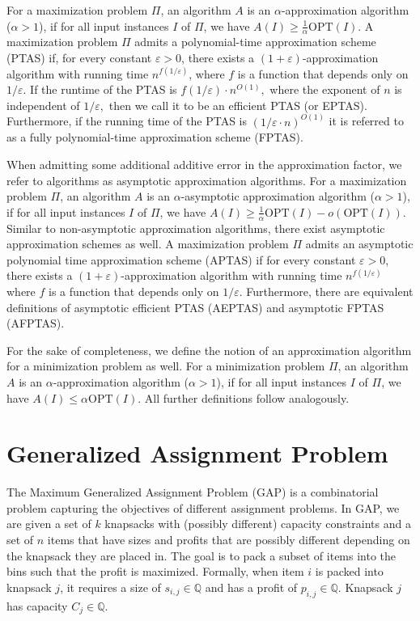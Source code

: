 \documentclass[10pt,a4paper]{amsart}
\newcommand{\eps}{\varepsilon}
\theoremstyle{definition}
\begin{document}
For a maximization problem $\Pi$, an algorithm $A$ is an $\alpha$-approximation algorithm ($\alpha>1$), if for all input instances $I$ of $\Pi$, we have  $A(I)\ge \frac{1}{\alpha} \text{OPT}(I)$. 
A maximization problem $\Pi$ admits a polynomial-time approximation scheme (PTAS) if, for every constant $\eps>0$, there exists a $(1+\eps)$-approximation algorithm with running time $n^{f(1/\eps)}$, where $f$ is a function that depends only on $1/\eps$.
If the runtime of the PTAS is ${f(1/\eps)} \cdot n^{O(1)},$ where the exponent of $n$ is independent of $1/\eps,$ then we call it to be an efficient PTAS (or EPTAS). 
Furthermore, if the running time of the PTAS is $(1/\eps\cdot n)^{O(1)}$ it is referred to as a fully polynomial-time approximation scheme (FPTAS). 

When admitting some additional additive error in the approximation factor, we refer to algorithms as asymptotic approximation algorithms. For a maximization problem $\Pi$, an algorithm $A$ is an $\alpha$-asymptotic approximation algorithm ($\alpha>1$), if for all input instances $I$ of $\Pi$, we have  $A(I)\ge \frac{1}{\alpha} \text{OPT}(I)- o(\text{OPT}(I))$. 
Similar to non-asymptotic approximation algorithms, there exist asymptotic approximation schemes as well. A maximization problem $\Pi$ admits an asymptotic polynomial time approximation scheme (APTAS) if for every constant $\eps>0$, there exists a $(1+\eps)$-approximation algorithm with running time $n^{f(1/\eps)}$ where $f$ is a function that depends only on $1/\eps$. Furthermore, there are equivalent definitions of asymptotic efficient PTAS (AEPTAS) and asymptotic FPTAS (AFPTAS).

For the sake of completeness, we define the notion of an approximation algorithm for a minimization problem as well. 
For a minimization problem $\Pi$, an algorithm $A$ is an $\alpha$-approximation algorithm ($\alpha>1$), if for all input instances $I$ of $\Pi$, we have  $A(I) \le \alpha \text{OPT}(I)$. All further definitions follow analogously.



\section{Generalized Assignment Problem}
\label{subsec:GAP}
The Maximum Generalized Assignment Problem (GAP) is a combinatorial problem capturing the objectives of different assignment problems. In GAP, we are given a set of $k$ knapsacks with (possibly different) capacity constraints and a set of $n$ items that have sizes and profits that are possibly different depending on the knapsack they are placed in. The goal is to pack a subset of items into the bins such that the profit is maximized. Formally, when item $i$ is packed into knapsack $j$, it requires a size of $s_{i,j}\in \mathbb{Q}$ and has a profit of $p_{i,j}\in \mathbb{Q}.$ Knapsack $j$ has capacity $C_j \in \mathbb{Q}$.
\end{document}
